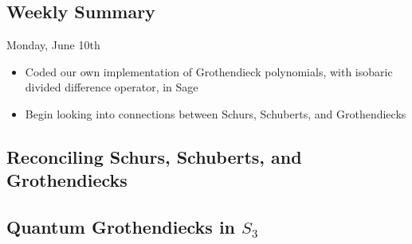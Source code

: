 \subsection{Weekly Summary}

Monday, June 10th
\begin{itemize}
    \item Coded our own implementation of Grothendieck polynomials, with isobaric divided difference operator, in Sage
    \item Begin looking into connections between Schurs, Schuberts, and Grothendiecks
\end{itemize}

\subsection{Reconciling Schurs, Schuberts, and Grothendiecks}




\subsection{Quantum Grothendiecks in $S_3$}